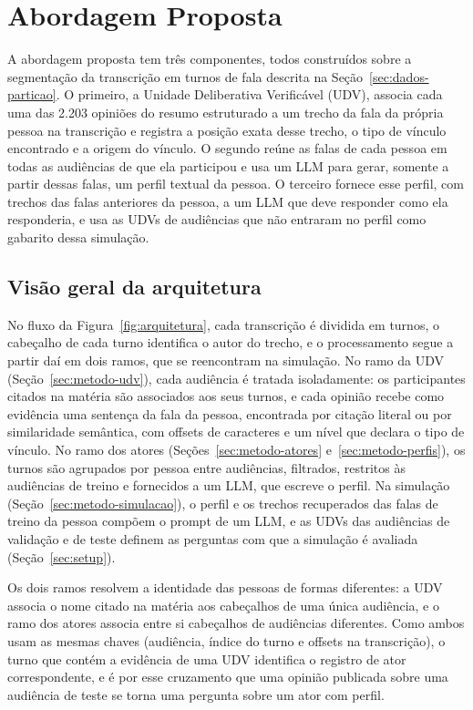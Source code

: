 \section{Abordagem Proposta}
\label{sec:metodo}

A abordagem proposta tem três componentes, todos construídos sobre a segmentação da transcrição em
turnos de fala descrita na Seção~\ref{sec:dados-particao}. O primeiro, a Unidade Deliberativa
Verificável (UDV), associa cada uma das 2.203 opiniões do resumo estruturado a um trecho da fala da
própria pessoa na transcrição e registra a posição exata desse trecho, o tipo de vínculo encontrado e
a origem do vínculo. O segundo reúne as falas de cada pessoa em todas as audiências de que ela
participou e usa um LLM para gerar, somente a partir dessas falas, um perfil textual da pessoa. O
terceiro fornece esse perfil, com trechos das falas anteriores da pessoa, a um LLM que deve
responder como ela responderia, e usa as UDVs de audiências que não entraram no perfil como gabarito
dessa simulação.

\subsection{Visão geral da arquitetura}
\label{sec:metodo-visao}



No fluxo da Figura~\ref{fig:arquitetura}, cada transcrição é dividida em turnos, o cabeçalho
de cada turno identifica o autor do trecho, e o processamento segue a partir daí em dois ramos, que
se reencontram na simulação. No ramo da UDV (Seção~\ref{sec:metodo-udv}), cada audiência é tratada
isoladamente: os participantes citados na matéria são associados aos seus turnos, e cada opinião
recebe como evidência uma sentença da fala da pessoa, encontrada por citação literal ou por
similaridade semântica, com offsets de caracteres e um nível que declara o tipo de vínculo. No ramo
dos atores (Seções~\ref{sec:metodo-atores} e~\ref{sec:metodo-perfis}), os turnos são agrupados por
pessoa entre audiências, filtrados, restritos às audiências de treino e fornecidos a um LLM, que
escreve o perfil. Na simulação (Seção~\ref{sec:metodo-simulacao}), o perfil e os trechos
recuperados das falas de treino da pessoa compõem o prompt de um LLM, e as UDVs das audiências de
validação e de teste definem as perguntas com que a simulação é avaliada (Seção~\ref{sec:setup}).

Os dois ramos resolvem a identidade das pessoas de formas diferentes: a UDV associa o nome citado na
matéria aos cabeçalhos de uma única audiência, e o ramo dos atores associa entre si cabeçalhos de
audiências diferentes. Como ambos usam as mesmas chaves (audiência, índice do turno e offsets na
transcrição), o turno que contém a evidência de uma UDV identifica o registro de ator
correspondente, e é por esse cruzamento que uma opinião publicada sobre uma audiência de teste se
torna uma pergunta sobre um ator com perfil.

